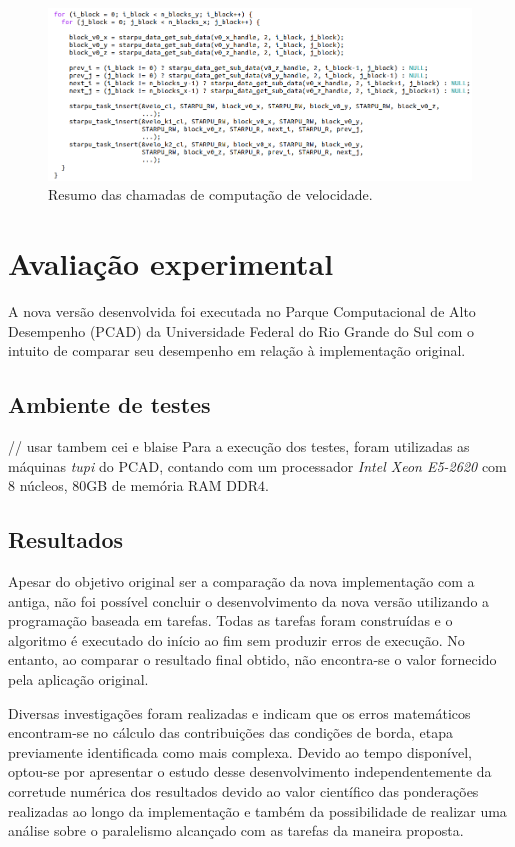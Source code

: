 \documentclass[cic,tc]{iiufrgs}
\begin{document}
\begin{figure}[!htb]
  \caption{Resumo das chamadas de computação de velocidade.}
    \begin{center} 
      \includegraphics[width=35em]{kernels_velo}
    \end{center}
    \label{fig:kernels_velo}
\end{figure}


\chapter{Avaliação experimental}\label{sec:exp}

A nova versão desenvolvida foi executada no Parque Computacional de Alto Desempenho (PCAD) da Universidade Federal do Rio Grande do Sul com o
intuito de comparar seu desempenho em relação à implementação original.

\section{Ambiente de testes}
 // usar tambem cei e blaise
Para a execução dos testes, foram utilizadas as máquinas \textit{tupi} do PCAD, contando com um processador \textit{Intel Xeon E5-2620} com $8$
núcleos, $80$GB de memória RAM DDR$4$.
\section{Resultados}

Apesar do objetivo original ser a comparação da nova implementação com a antiga, não foi possível concluir o desenvolvimento da nova versão utilizando
a programação baseada em tarefas. Todas as tarefas foram construídas e o algoritmo é executado do início ao fim sem produzir erros de execução. No entanto,
ao comparar o resultado final obtido, não encontra-se o valor fornecido pela aplicação original.

Diversas investigações foram realizadas e indicam que os erros matemáticos encontram-se no cálculo das contribuições das condições de borda, etapa previamente
identificada como mais complexa. Devido ao tempo disponível, optou-se por apresentar o estudo desse desenvolvimento independentemente da corretude numérica dos resultados
devido ao valor científico das ponderações realizadas ao longo da implementação e também da possibilidade de realizar uma análise sobre o paralelismo alcançado
com as tarefas da maneira proposta.
\end{document}
